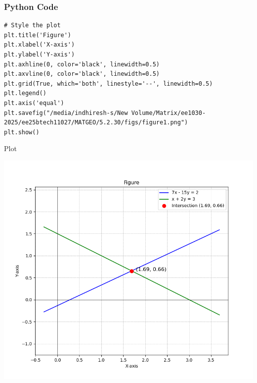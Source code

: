 \documentclass{beamer}
\begin{document}
\begin{frame}[fragile]
    \frametitle{Python Code}
    \begin{lstlisting}
# Style the plot
plt.title('Figure')
plt.xlabel('X-axis')
plt.ylabel('Y-axis')
plt.axhline(0, color='black', linewidth=0.5)
plt.axvline(0, color='black', linewidth=0.5)
plt.grid(True, which='both', linestyle='--', linewidth=0.5)
plt.legend()
plt.axis('equal')
plt.savefig("/media/indhiresh-s/New Volume/Matrix/ee1030-2025/ee25btech11027/MATGEO/5.2.30/figs/figure1.png")
plt.show()
    \end{lstlisting}
\end{frame}


\begin{frame}{Plot}
    \begin{center}
        \includegraphics[width=\columnwidth, height=0.8\textheight, keepaspectratio]{figs/figure1.png}
    \end{center}
\end{frame}
\end{document}
